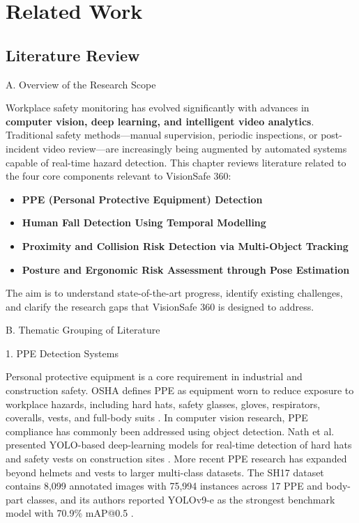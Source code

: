 \chapter{Related Work}

\section{Literature Review}

A. Overview of the Research Scope

Workplace safety monitoring has evolved significantly with advances in \textbf{computer vision, deep learning, and intelligent video analytics}. Traditional safety methods—manual supervision, periodic inspections, or post-incident video review—are increasingly being augmented by automated systems capable of real-time hazard detection. This chapter reviews literature related to the four core components relevant to VisionSafe 360:

\begin{itemize}
\item \textbf{PPE (Personal Protective Equipment) Detection}
\item \textbf{Human Fall Detection Using Temporal Modelling}
\item \textbf{Proximity and Collision Risk Detection via Multi-Object Tracking}
\item \textbf{Posture and Ergonomic Risk Assessment through Pose Estimation}
\end{itemize}

The aim is to understand state-of-the-art progress, identify existing challenges, and clarify the research gaps that VisionSafe 360 is designed to address.

B. Thematic Grouping of Literature

1. PPE Detection Systems

Personal protective equipment is a core requirement in industrial and construction safety. OSHA defines PPE as equipment worn to reduce exposure to workplace hazards, including hard hats, safety glasses, gloves, respirators, coveralls, vests, and full-body suits \cite{osha_ppe_overview}. In computer vision research, PPE compliance has commonly been addressed using object detection. Nath et al. presented YOLO-based deep-learning models for real-time detection of hard hats and safety vests on construction sites \cite{nath2020ppe}. More recent PPE research has expanded beyond helmets and vests to larger multi-class datasets. The SH17 dataset contains 8,099 annotated images with 75,994 instances across 17 PPE and body-part classes, and its authors reported YOLOv9-e as the strongest benchmark model with 70.9\% mAP@0.5 \cite{ahmad2024sh17}.

